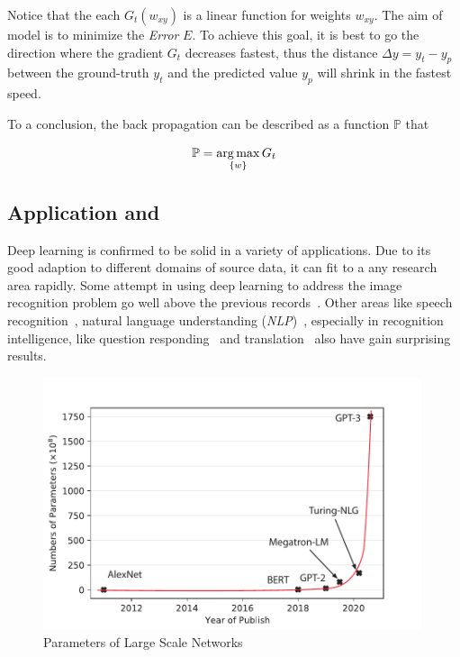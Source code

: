 \begin{spacing}{1.5}
Notice that the each $G_t(w_{xy})$ is a linear function for weights $w_{xy}$. The aim of model is to minimize the \textit{Error} $E$. To achieve this goal, it is best to go the direction where the gradient $G_t$ decreases fastest, thus the distance $\Delta y=y_t-y_p$ between the ground-truth $y_t$ and the predicted value $y_p$ will shrink in the fastest speed.

To a conclusion, the back propagation can be described as a function $\mathbb{P}$ that

\begin{equation}
    \mathbb{P}=\operatorname*{arg\,max}_{\{w\}}G_t
\end{equation}

\subsection{Application and }

Deep learning is confirmed to be solid in a variety of applications. Due to its good adaption to different domains of source data, it can fit to a any research area rapidly. Some attempt in using deep learning to address the image recognition problem go well above the previous records~\cite{krizhevsky2012imagenet, farabet2012learning, tompson2014joint, szegedy2015going}. Other areas like speech recognition~\cite{mikolov2011strategies, hinton2012deep, sainath2013deep}, natural language understanding (\textit{NLP})~\cite{collobert2011natural}, especially in recognition intelligence, like question responding~\cite{bordes2014question} and translation~\cite{jean2014using, sutskever2014sequence} also have gain surprising results. 

\begin{figure}[ht]
\centering
\includegraphics[width=0.99\textwidth, fbox]{Chapter2/paramnum.pdf}
\caption{Parameters of Large Scale Networks}
\label{fig:paramnum} 
\end{figure}


\end{spacing}
